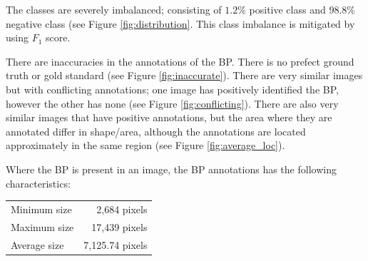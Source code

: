 \documentclass{article}
\begin{document}
The classes are severely imbalanced; consisting of $1.2\%$ positive class and $98.8\%$ negative class (see Figure \ref{fig:distribution}. This class imbalance is mitigated by using $F_1$ score.

There are inaccuracies in the annotations of the BP. There is no prefect ground truth or gold standard (see Figure \ref{fig:inaccurate}). There are very similar images but with conflicting annotations; one image has positively identified the BP, however the other has none (see Figure \ref{fig:conflicting}). There are also very similar images that have positive annotations, but the area where they are annotated differ in shape/area, although the annotations are located approximately in the same region (see Figure \ref{fig:average_loc}).



Where the BP is present in an image, the BP annotations has the following characteristics:

\centering
\begin{tabular}{l r}
Minimum size  &      2,684 pixels \\
Maximum size &    17,439 pixels \\
Average size   & 7,125.74 pixels \\
\end{tabular}







\end{document}
